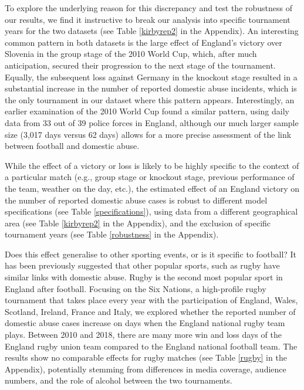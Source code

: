 \documentclass[12pt, letterpaper]{article}
\newcommand{\TM}[1] {{\textcolor{orange}{#1}}}
\begin{document}
To explore the underlying reason for this discrepancy and test the robustness of our results, we find it instructive to break our analysis into specific tournament years for the two datasets (see Table \ref{kirbyrep2} in the Appendix). An interesting common pattern in both datasets is the large effect of England's victory over Slovenia in the group stage of the 2010 World Cup, which, after much anticipation, secured their progression to the next stage of the tournament. Equally, the subsequent loss against Germany in the knockout stage resulted in a substantial increase in the number of reported domestic abuse incidents, which is the only tournament in our dataset where this pattern appears. Interestingly, an earlier examination of the 2010 World Cup found a similar pattern, using daily data from 33 out of 39 police forces in England\autocite{Brimicombe2012}, although our much larger sample size (3,017 days versus 62 days) allows for a more precise assessment of the link between football and domestic abuse.


While the effect of a victory or loss is likely to be highly specific to the context of a particular match (e.g., group stage or knockout stage, previous performance of the team, weather on the day, etc.), the estimated effect of an England victory on the number of reported domestic abuse cases is robust to different model specifications (see Table \ref{specifications}), using data from a different geographical area (see Table \ref{kirbyrep2} in the Appendix), and the exclusion of specific tournament years (see Table \ref{robustness} in the Appendix). 

Does this effect generalise to other sporting events, or is it specific to football?
It has been previously suggested that other popular sports, such as rugby have similar links with domestic abuse\autocite{Brooks-Hay2018}. Rugby is the second most popular sport in England after football\autocite{Ipsos2003}. Focusing on the Six Nations, a high-profile rugby tournament that takes place every year with the participation of England, Wales, Scotland, Ireland, France and Italy, we explored whether the reported number of domestic abuse cases increase on days when the England national rugby team plays. Between 2010 and 2018, there are many more win and loss days of the England rugby union team compared to the England national football team. The results show no comparable effects for rugby matches (see Table \ref{rugby} in the Appendix), potentially stemming from differences in media coverage, audience numbers, and the role of alcohol between the two tournaments. 
\end{document}
